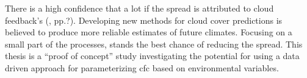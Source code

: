There is a high confidence that a lot if the spread is attributed to cloud feedback's (\cite{IPCC_CH9_climate_models}, pp.?). Developing new methods for cloud cover predictions is believed to produce more reliable estimates of future climates. Focusing on a small part of the processes, stands the best chance of reducing the spread. This thesis is a ``proof of concept'' study investigating the potential for using a data driven approach for parameterizing \acrfull{cfc} based on environmental variables. 


